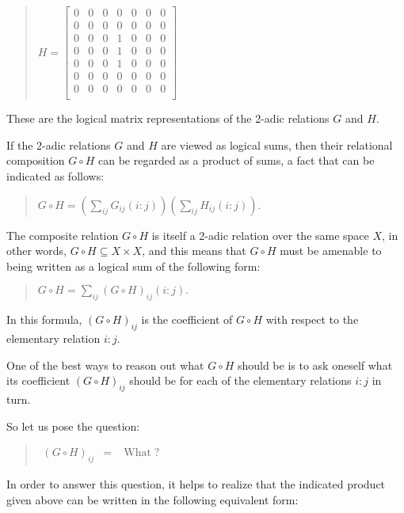 \documentclass[12pt]{article}
\begin{document}
\begin{quote}$H =
\left[\begin{array}{ccccccc}
0 & 0 & 0 & 0 & 0 & 0 & 0 \\
0 & 0 & 0 & 0 & 0 & 0 & 0 \\
0 & 0 & 0 & 1 & 0 & 0 & 0 \\
0 & 0 & 0 & 1 & 0 & 0 & 0 \\
0 & 0 & 0 & 1 & 0 & 0 & 0 \\
0 & 0 & 0 & 0 & 0 & 0 & 0 \\
0 & 0 & 0 & 0 & 0 & 0 & 0 \\
\end{array}\right]$\end{quote}

These are the logical matrix representations of the 2-adic relations $G$ and $H$.

If the 2-adic relations $G$ and $H$ are viewed as logical sums, then their relational composition $G \circ H$ can be regarded as a product of sums, a fact that can be indicated as follows:

\begin{quote}
$G \circ H = (\sum_{ij} G_{ij}(i:j))(\sum_{ij} H_{ij}(i:j)).$
\end{quote}

The composite relation $G \circ H$ is itself a 2-adic relation over the same space $X$, in other words, $G \circ H \subseteq X \times X$, and this means that $G \circ H$ must be amenable to being written as a logical sum of the following form:

\begin{quote}
$G \circ H = \sum_{ij}(G \circ H)_{ij}(i:j).$
\end{quote}

In this formula, $(G \circ H)_{ij}$ is the coefficient of $G \circ H$ with respect to the elementary relation $i:j$.

One of the best ways to reason out what $G \circ H$ should be is to ask oneself what its coefficient $(G \circ H)_{ij}$ should be for each of the elementary relations $i:j$ in turn.

So let us pose the question:

\begin{quote}$\begin{array}{lll}
(G \circ H)_{ij} & = & \operatorname{What}?
\end{array}$\end{quote}

In order to answer this question, it helps to realize that the indicated product given above can be written in the following equivalent form:
\end{document}
